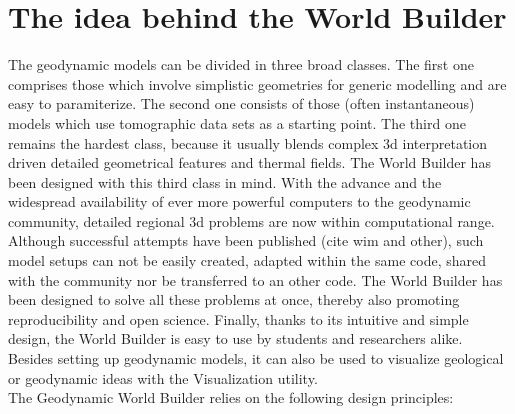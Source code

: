 \documentclass{book}
\newcommand{\GWB}{{Geodynamic World Builder}}
\newcommand{\WB}{{World Builder}}
\begin{document}
\section{The idea behind the World Builder}
\label{section:idea_behind_WB}
The geodynamic models can be divided in three broad classes. The first one comprises those which involve simplistic geometries for generic modelling and are easy to paramiterize. 
The second one consists of those (often instantaneous) models which use tomographic data sets as a starting point. 
The third one remains the hardest class, because it usually blends complex 3d interpretation driven detailed geometrical features and thermal fields. The \WB{} has been designed with this third class in mind. 
With the advance and the widespread availability of ever more powerful computers to the geodynamic community, detailed regional 3d problems are now within computational range. Although successful attempts have been published (cite wim and other), such model setups can not be easily created, adapted within the same code, shared with the community nor be transferred to an other code. 
The \WB{} has been designed to solve all these problems at once, thereby also promoting reproducibility and open science. 
Finally, thanks to its intuitive and simple design, the \WB{} is easy to use by students and researchers alike. Besides setting up geodynamic models, it can also be used to visualize geological or geodynamic ideas with the Visualization utility. 
\\
The \GWB{} relies on the following design principles:
\\
\end{document}
